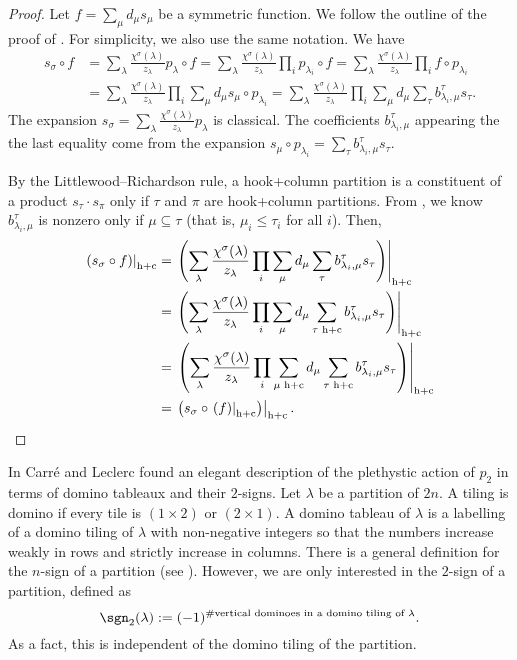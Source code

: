 \documentclass[twoside]{article}
\renewcommand{\hc}[1]{\left.\left(#1\right)\right|_{\textnormal{h+c}}}
\begin{document}
\begin{proof}
Let $f = \sum_\mu d_\mu s_\mu$ be a symmetric function. We follow the outline of the proof of \cite[Theorem 5.1]{gutierrez}. For simplicity, we also use the same notation. We have
\begin{align*}
    s_\sigma\circ f
    &= \sum_\lambda \frac{\chi^\sigma(\lambda)}{z_\lambda} p_\lambda\circ f
    = \sum_\lambda \frac{\chi^\sigma(\lambda)}{z_\lambda} \prod_i p_{\lambda_i}\circ f
    = \sum_\lambda \frac{\chi^\sigma(\lambda)}{z_\lambda} \prod_i f\circ p_{\lambda_i}\\
    &= \sum_\lambda \frac{\chi^\sigma(\lambda)}{z_\lambda} \prod_i \sum_\mu d_\mu s_\mu \circ p_{\lambda_i}
    = \sum_\lambda \frac{\chi^\sigma(\lambda)}{z_\lambda} \prod_i \sum_\mu d_\mu \sum_\tau b_{\lambda_i,\mu}^\tau s_\tau.
\end{align*}
The expansion $s_\sigma= \sum_\lambda \frac{\chi^\sigma(\lambda)}{z_\lambda} p_\lambda$ is classical. The coefficients $b_{\lambda_i,\mu}^\tau$ appearing the the last equality come from the expansion $s_\mu \circ p_{\lambda_i} = \sum_\tau b_{\lambda_i,\mu}^\tau s_\tau$.


By the Littlewood--Richardson rule, a hook+column partition is a constituent of a product $s_\tau\cdot s_\pi$ only if $\tau$ and $\pi$ are hook+column partitions.
From \cite[Theorem 4.1]{gutierrez}, we know $b_{\lambda_i,\mu}^\tau$ is nonzero only if $\mu\subseteq\tau$ (that is, $\mu_i\le\tau_i$ for all $i$). Then,
\begin{align*}
    \hc{s_\sigma\circ f}
    &= \hc{\sum_\lambda\frac{\chi^\sigma(\lambda)}{z_\lambda} \prod_i \sum_\mu d_\mu \sum_{\tau} b_{\lambda_i,\mu}^\tau s_\tau}\\
    &= \hc{\sum_\lambda\frac{\chi^\sigma(\lambda)}{z_\lambda} \prod_i \sum_\mu d_\mu \sum_{\tau \text{ h+c}} b_{\lambda_i,\mu}^\tau s_\tau}\\
    &= \hc{\sum_\lambda\frac{\chi^\sigma(\lambda)}{z_\lambda} \prod_i \sum_{\mu \text{ h+c}} d_\mu \sum_{\tau \text{ h+c}} b_{\lambda_i,\mu}^\tau s_\tau} \\
    &= \hc{s_\sigma\circ\hc{f}}.
\end{align*}
\end{proof}


In \cite{carre}  Carré and Leclerc found an elegant description of the  plethystic action of $p_2$ in terms of domino tableaux and their $2$-signs. 
Let $\lambda$ be a partition of $2n$. A tiling is domino if every tile is $(1\times2)$ or $(2\times1)$.
A domino tableau of $\lambda$ is a labelling of a domino tiling of $\lambda$ with non-negative integers so that the numbers increase weakly in rows and strictly increase in columns.
There is a general definition for the $n$-sign of a partition (see \cite{wildon}). However, we are only interested in the $2$-sign of a partition, defined as
\[
    \sgn_2(\lambda):=(-1)^{\#\text{vertical dominoes in a domino tiling of $\lambda$}}.
\]
As a fact, this is independent of the domino tiling of the partition.
\end{document}
